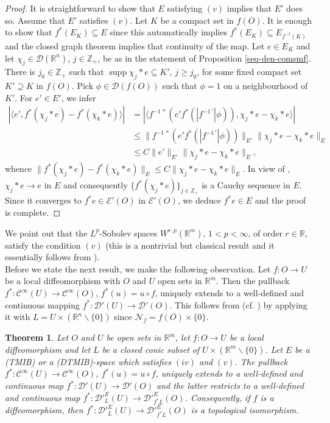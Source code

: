 \documentclass[12pt,reqno]{amsart}
\newcommand{\RR}{\mathbb R}
\newcommand{\ZZ}{\mathbb Z}
\newcommand{\EE}{\mathcal E}
\newcommand{\DD}{\mathcal D}
\newcommand{\supp}{\operatorname{supp}}
\theoremstyle{plain}
\newtheorem{theorem}{Theorem}[section]
\theoremstyle{remark}
\theoremstyle{definition}
\numberwithin{equation}{section}
\begin{document}
\begin{proof}
It is straightforward to show that $E$ satisfying $(v)$ implies that $E'$ does so. Assume that $E'$ satisfies $(v)$. Let $K$ be a compact set in $f(O)$. It is enough to show that $f^*(E_K)\subseteq E$ since this automatically implies $f^*(E_K)\subseteq E_{f^{-1}(K)}$ and the closed graph theorem implies that continuity of the map. Let $e\in E_K$ and let $\chi_j\in\DD(\RR^n)$, $j\in\ZZ_+$, be as in the statement of Proposition \ref{seq-den-comsmf}. There is $j_0\in\ZZ_+$ such that $\supp\chi_j*e\subseteq K'$, $j\geq j_0$, for some fixed compact set $K'\supseteq K$ in $f(O)$. Pick $\phi\in \DD(f(O))$ such that $\phi=1$ on a neighbourhood of $K'$. For $e'\in E'$, we infer
\begin{align*}
|\langle e',f^*(\chi_j*e)-f^*(\chi_k*e)\rangle|&=|\langle f^{-1\,*}(e'f^*(|f^{-1\,'}|\phi)),\chi_j*e-\chi_k*e\rangle|\\
&\leq \|f^{-1\,*}(e'f^*(|f^{-1\,'}|\phi))\|_{E'}\|\chi_j*e-\chi_k*e\|_E\\
&\leq C\|e'\|_{E'}\|\chi_j*e-\chi_k*e\|_E,
\end{align*}
whence $\|f^*(\chi_j*e)-f^*(\chi_k*e)\|_E\leq C\|\chi_j*e-\chi_k*e\|_E$. In view of \cite[Corollary 1]{DPV}, $\chi_j*e\rightarrow e$ in $E$ and consequently $\{f^*(\chi_j*e)\}_{j\in\ZZ_+}$ is a Cauchy sequence in $E$. Since it converges to $f^*e\in \EE'(O)$ in $\EE'(O)$, we deduce $f^*e\in E$ and the proof is complete.
\end{proof}

We point out that the $L^p$-Sobolev spaces $W^{r,p}(\RR^m)$, $1<p<\infty$, of order $r\in \RR$, satisfy the condition $(v)$ (this is a nontrivial but classical result and it essentially follows from \cite[Theorem 18.1.17, p. 81]{hor2}).\\
\indent Before we state the next result, we make the following observation. Let $f:O\rightarrow U$ be a local diffeomorphism with $O$ and $U$ open sets in $\RR^m$. Then the pullback $f^*:\mathcal{C}^{\infty}(U)\rightarrow \mathcal{C}^{\infty}(O)$, $f^*(u)=u\circ f$, uniquely extends to a well-defined and continuous mapping $f^*:\DD'(U)\rightarrow \DD'(O)$. This follows from \cite[Theorem 3.21]{PP} (cf. \cite[Remark 3.6]{PP}) by applying it with $L=U\times(\RR^n\backslash\{0\})$ since $\mathcal{N}_f=f(O)\times \{0\}$.


\begin{theorem}\label{pull-back-diff}
Let $O$ and $U$ be open sets in $\RR^m$, let $f:O\rightarrow U$ be a local diffeomorphism and let $L$ be a closed conic subset of $U\times (\RR^m\backslash\{0\})$. Let $E$ be a (TMIB) or a (DTMIB)-space which satisfies $(iv)$ and $(v)$. The pullback $f^*:\mathcal{C}^{\infty}(U)\rightarrow \mathcal{C}^{\infty}(O)$, $f^*(u)=u\circ f$, uniquely extends to a well-defined and continuous map $f^*:\DD'(U)\rightarrow \DD'(O)$ and the latter restricts to a well-defined and continuous map $f^*:\DD'^E_L(U)\rightarrow \DD'^E_{f^*L}(O)$. Consequently, if $f$ is a diffeomorphism, then $f^*:\DD'^E_L(U)\rightarrow \DD'^E_{f^*L}(O)$ is a topological isomorphism.
\end{theorem}
\end{document}
